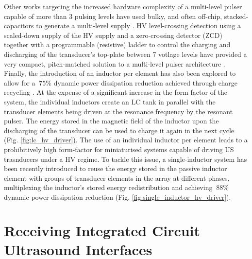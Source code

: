 Other works targeting the increased hardware complexity of a multi-level pulser capable of more than 3 pulsing levels have used bulky, and often off-chip, stacked-capacitors to generate a multi-level supply \cite{}. HV level-crossing detection using a scaled-down supply of the HV supply and a zero-crossing detector (ZCD) together with a programmable (resistive) ladder to control the charging and discharging of the transducer's top-plate between 7 votlage levels have provided a very compact, pitch-matched solution to a multi-level pulser architecture \cite{}. Finally, the introduction of an inductor per element has also been explored to allow for a $\mathrm{~75\%}$ dynamic power dissipation reduction achieved through charge recycling \cite{https://ieeexplore.ieee.org/abstract/document/9365826, https://ieeexplore.ieee.org/abstract/document/10454286}. At the expense of a significant increase in the form factor of the system, the individual inductors create an LC tank in parallel with the transducer elements being driven at the resonance frequency by the resonant pulser. The energy stored in the magnetic field of the inductor upon the discharging of the transducer can be used to charge it again in the next cycle (Fig. \ref{fig:lc_hv_driver}). The use of an individual inductor per element leads to a prohibitively high form-factor for miniaturised systems capable of driving US trasnducers under a HV regime. To tackle this issue, a single-inductor system has been recently introduced to reuse the energy stored in the passive inductor element with groups of transducer elements in the array at different phases, multiplexing the inductor's stored energy redistribution and achieving $\mathrm{~88\%}$ dynamic power dissipation reduction \cite{https://ieeexplore.ieee.org/document/10904513} (Fig. \ref{fig:single_inductor_hv_driver}).


\section{Receiving Integrated Circuit Ultrasound Interfaces}
\label{sec:ultrasound_tx_interfaces}

